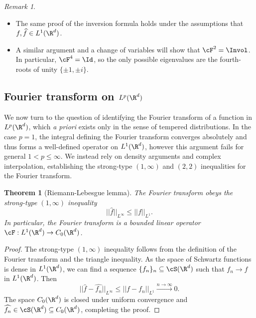 \documentclass[reqno]{amsart}
\newtheorem{theorem}{Theorem}
\theoremstyle{definition}
\theoremstyle{remark}
\newtheorem*{remark}{Remark}
\begin{document}
\begin{remark}
\leavevmode
\begin{itemize}
	\item The same proof of the inversion formula holds under the assumptions that $f, \widehat f \in L^1 (\R^d)$.  
	
	\item A similar argument and a change of variables will show that $\cF^2 = \Invol$. In particular, $\cF^4 = \Id$, so the only possible eigenvalues are the fourth-roots of unity $\{ \pm 1, \pm i \}$. 
\end{itemize}
\end{remark}	


\subsection{Fourier transform on $L^p (\R^d)$}

We now turn to the question of identifying the Fourier transform of a function in $L^p (\R^d)$, which \textit{a priori} exists only in the sense of tempered distributions. In the case $p = 1$, the integral defining the Fourier transform converges absolutely and thus forms a well-defined operator on $L^1 (\R^d)$, however this argument fails for general $1 < p \leq \infty$. We instead rely on density arguments and complex interpolation, establishing the strong-type $(1, \infty)$ and $(2, 2)$ inequalities for the Fourier transform.


\begin{theorem}[Riemann-Lebesgue lemma]
	The Fourier transform obeys the strong-type $(1, \infty)$ inequality
		\[ ||\widehat f||_{L^\infty} \leq ||f||_{L^1}. \]
	In particular, the Fourier transform is a bounded linear operator $\cF : L^1 (\R^d) \to C_0 (\R^d)$. 
\end{theorem}

\begin{proof}
	The strong-type $(1, \infty)$ inequality follows from the definition of the Fourier transform and the triangle inequality. As the space of Schwartz functions is dense in $L^1 (\R^d)$, we can find a sequence $\{f_n\}_n \subseteq \cS (\R^d)$ such that $f_n \to f$ in $L^1 (\R^d)$. Then 
		\[ ||\widehat f - \widehat{f_n}||_{L^\infty} \leq ||f - f_n||_{L^1} \overset{n \to \infty}{\longrightarrow} 0. \]
	The space $C_0 (\R^d)$ is closed under uniform convergence and $\widehat{f_n} \in \cS (\R^d) \subseteq C_0 (\R^d)$, completing the proof. 
\end{proof}
\end{document}
